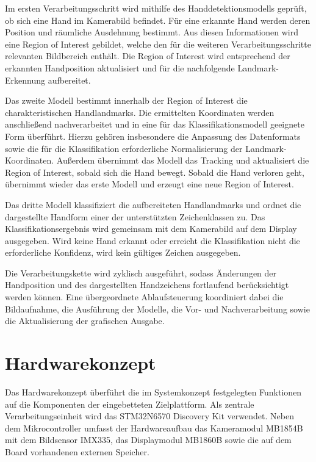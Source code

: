 Im ersten Verarbeitungsschritt wird mithilfe des Handdetektionsmodells geprüft, ob sich eine Hand im Kamerabild befindet. Für eine erkannte Hand werden deren Position und räumliche Ausdehnung bestimmt. Aus diesen Informationen wird eine Region of Interest gebildet, welche den für die weiteren Verarbeitungsschritte relevanten Bildbereich enthält. Die Region of Interest wird entsprechend der erkannten Handposition aktualisiert und für die nachfolgende Landmark-Erkennung aufbereitet.

Das zweite Modell bestimmt innerhalb der Region of Interest die charakteristischen Handlandmarks. Die ermittelten Koordinaten werden anschließend nachverarbeitet und in eine für das Klassifikationsmodell geeignete Form überführt. Hierzu gehören insbesondere die Anpassung des Datenformats sowie die für die Klassifikation erforderliche Normalisierung der Landmark-Koordinaten. Außerdem übernimmt das Modell das Tracking und aktualisiert die Region of Interest, sobald sich die Hand bewegt. Sobald die Hand verloren geht, übernimmt wieder das erste Modell und erzeugt eine neue Region of Interest.

Das dritte Modell klassifiziert die aufbereiteten Handlandmarks und ordnet die dargestellte Handform einer der unterstützten Zeichenklassen zu. Das Klassifikationsergebnis wird gemeinsam mit dem Kamerabild auf dem Display ausgegeben. Wird keine Hand erkannt oder erreicht die Klassifikation nicht die erforderliche Konfidenz, wird kein gültiges Zeichen ausgegeben.

Die Verarbeitungskette wird zyklisch ausgeführt, sodass Änderungen der Handposition und des dargestellten Handzeichens fortlaufend berücksichtigt werden können. Eine übergeordnete Ablaufsteuerung koordiniert dabei die Bildaufnahme, die Ausführung der Modelle, die Vor- und Nachverarbeitung sowie die Aktualisierung der grafischen Ausgabe.

\section{Hardwarekonzept}

Das Hardwarekonzept überführt die im Systemkonzept festgelegten Funktionen auf die Komponenten der eingebetteten Zielplattform. Als zentrale Verarbeitungseinheit wird das STM32N6570 Discovery Kit verwendet. Neben dem Mikrocontroller umfasst der Hardwareaufbau das Kameramodul MB1854B mit dem Bildsensor IMX335, das Displaymodul MB1860B sowie die auf dem Board vorhandenen externen Speicher.

